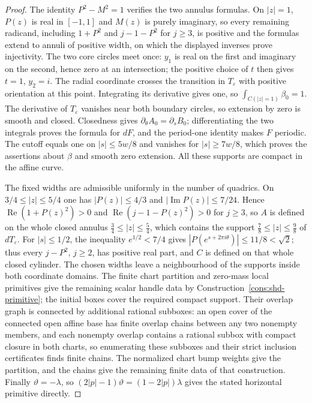 \begin{proof}
The identity $P^2-M^2=1$ verifies the two annulus formulas. On $|z|=1$, $P(z)$ is real in $[-1,1]$ and $M(z)$ is purely imaginary,
so every remaining radicand, including $1+P^2$ and $j-1-P^2$ for $j\ge3$, is positive and the formulas extend to annuli of positive
width, on which the displayed inverses prove injectivity. The two core circles meet once: $y_1$ is real on the first and imaginary
on the second, hence zero at an intersection; the positive choice of $t$ then gives $t=1$, $y_2=i$. The radial coordinate crosses
the transition in $T_\varepsilon$ with positive orientation at this point. Integrating its derivative gives one, so
$\int_{C(|z|=1)}\beta_0=1$. The derivative of $T_\varepsilon$ vanishes near both boundary circles, so extension by zero is smooth
and closed. Closedness gives $\partial_\theta A_0=\partial_s B_0$; differentiating the two integrals proves the formula for $dF$,
and the period-one identity makes $F$ periodic. The cutoff equals one on $|s|\le5w/8$ and vanishes for $|s|\ge7w/8$, which proves
the assertions about $\beta$ and smooth zero extension. All these supports are compact in the affine curve.

The fixed widths are admissible uniformly in the number of quadrics. On $3/4\le|z|\le5/4$ one has $|P(z)|\le4/3$ and
$|\operatorname{Im}P(z)|\le7/24$. Hence $\operatorname{Re}(1+P(z)^2)>0$ and $\operatorname{Re}(j-1-P(z)^2)>0$ for $j\ge3$, so $A$ is
defined on the whole closed annulus $\frac34\le|z|\le\frac54$, which contains the support $\frac78\le|z|\le\frac98$ of
$dT_\varepsilon$. For $|s|\le1/2$, the inequality $e^{1/2}<7/4$ gives $|P(e^{s+2\pi i\theta})|\le11/8<\sqrt2$; thus every $j-P^2$,
$j\ge2$, has positive real part, and $C$ is defined on that whole closed cylinder. The chosen widths leave a neighbourhood of the
supports inside both coordinate domains. The finite chart partition and zero-mass local primitives give the remaining scalar handle
data by Construction~\ref{cons:shd-primitive}; the initial boxes cover the required compact support. Their overlap graph is
connected by additional rational subboxes: an open cover of the connected open affine base has finite overlap chains between any two
nonempty members, and each nonempty overlap contains a rational subbox with compact closure in both charts, so enumerating these
subboxes and their strict inclusion certificates finds finite chains. The normalized chart bump weights give the partition, and the
chains give the remaining finite data of that construction. Finally $\vartheta=-\lambda$, so $(2|p|-1)\vartheta=(1-2|p|)\lambda$
gives the stated horizontal primitive directly.
\end{proof}

